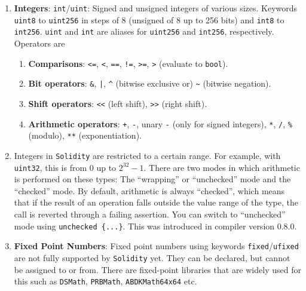 \begin{enumerate}
\item\textbf{Integers}: \verb|int|/\verb|uint|: Signed and unsigned integers of various sizes. Keywords \verb|uint8| to \verb|uint256| in steps of 8 (unsigned of 8 up to 256 bits) and \verb|int8| to \verb|int256|. \verb|uint| and \verb|int| are aliases for \verb|uint256| and \verb|int256|, respectively. Operators are
    \begin{enumerate}
    \item\textbf{Comparisons}: \verb|<=|, \verb|<|, \verb|==|, \verb|!=|, \verb|>=|, \verb|>| (evaluate to \verb|bool|).
    \item\textbf{Bit operators}: \verb|&|, \verb!|!, \verb|^| (bitwise exclusive or) \verb|~| (bitwise negation).
    \item\textbf{Shift operators}: \verb|<<| (left shift), \verb|>>| (right shift).
    \item\textbf{Arithmetic operators}: \verb|+|, \verb|-|, unary \verb|-| (only for signed integers), \verb|*|, \verb|/|, \verb|%| (modulo), \verb|**| (exponentiation).
    \end{enumerate}

\item Integers in \verb|Solidity| are restricted to a certain range. For example, with \verb|uint32|, this is from $0$ up to $2^{32}-1$. There are two modes in which arithmetic is performed on these types: The “wrapping” or “unchecked” mode and the “checked” mode. By default, arithmetic is always “checked”, which means that if the result of an operation falls outside the value range of the type, the call is reverted through a failing assertion. You can switch to “unchecked” mode using \verb|unchecked {...}|. This was introduced in compiler version 0.8.0.

\item\textbf{Fixed Point Numbers}: Fixed point numbers using keywords \verb|fixed|/\verb|ufixed| are not fully supported by \verb|Solidity| yet. They can be declared, but cannot be assigned to or from. There are fixed-point libraries that are widely used for this such as \verb|DSMath|, \verb|PRBMath|, \verb|ABDKMath64x64| etc.


\end{enumerate}
